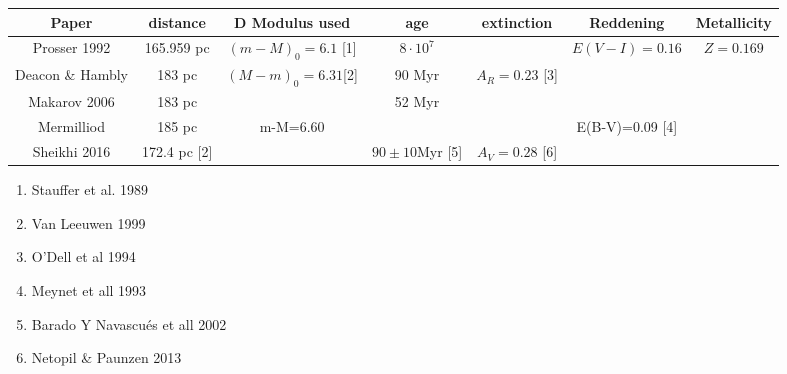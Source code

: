 \documentclass[landscape]{article}
\begin{document}
\begin{tabular}{|c| c c c c c c|}
\hline
Paper & distance & D Modulus used& age & extinction& Reddening& Metallicity\\
\hline
Prosser 1992& 165.959 pc & $(m-M)_0=6.1$ [1]& $8\cdot10^7$&&$E(V-I)=0.16$& $Z=0.169$\\
Deacon \& Hambly &183 pc& $(M-m)_0=6.31$[2]& 90 Myr &$A_R=0.23$ [3]& &\\
Makarov 2006 & 183 pc & &52 Myr &&& \\
Mermilliod & 185 pc & m-M=6.60& && E(B-V)=0.09 [4]&  \\
Sheikhi 2016 & 172.4 pc [2]&& $90 \pm 10$Myr [5]& $A_V=0.28$ [6]&&\\
\hline
\end{tabular}
\begin{enumerate}
\item Stauffer et al. 1989
\item Van Leeuwen 1999
\item O'Dell et al 1994
\item Meynet et all 1993
\item Barado Y Navascu\'es et all 2002
\item Netopil \& Paunzen 2013
\end{enumerate}
\end{document}
